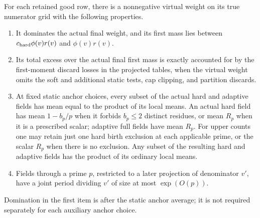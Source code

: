 \begin{proposition}
\label{tab:virtual-marginals}
For each retained good row, there is a nonnegative virtual weight
on its true numerator grid with the following properties.
\begin{enumerate}
\item It dominates the actual final weight, and its first mass
lies between $c_{\rm hard}\phi(v)r(v)$ and $\phi(v)r(v)$.
\item Its total excess over the actual final first mass is exactly
accounted for by the first-moment discard losses in the projected
tables, when the virtual weight omits the soft and additional
static tests, cap clipping, and partition discards.
\item At fixed static anchor choices, every subset of the
actual hard and adaptive fields has mean equal to the product
of its local means.  An actual hard field has mean $1-b_p/p$
when it forbids $b_p\le2$ distinct residues, or mean $R_p$
when it is a prescribed scalar; adaptive full fields have mean
$R_p$.  For upper counts one may retain just one hard birth
exclusion at each applicable prime, or the scalar $R_p$ when
there is no exclusion.  Any subset of the resulting hard and
adaptive fields has the product of its ordinary local means.
\item Fields through a prime $p$, restricted to a later projection
of denominator $v'$, have a joint period dividing $v'$ of size
at most $\exp(O(p))$.
\end{enumerate}
Domination in the first item is after the static anchor average;
it is not required separately for each auxiliary anchor choice.
\end{proposition}

